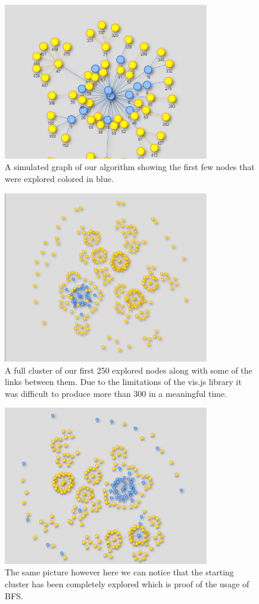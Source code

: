 \documentclass[runningheads]{llncs}
\begin{document}
\begin{figure}[H]
\centering
  \includegraphics[width=0.8\textwidth]{start.png}
  \caption{A simulated graph of our algorithm showing the first few nodes that were explored colored in blue.}
\end{figure}
\begin{figure}[H]
\centering
  \includegraphics[width=0.8\textwidth]{step1.png}
  \caption{A full cluster of our first 250 explored nodes along with some of the links between them. Due to the limitations of the vis.js library it was difficult to produce more than 300 in a meaningful time.}
\end{figure}
\begin{figure}[H]
\centering
  \includegraphics[width=0.8\textwidth]{step2.png}
  \caption{The same picture however here we can notice that the starting cluster has been completely explored which is proof of the usage of BFS.}
\end{figure}
\end{document}
